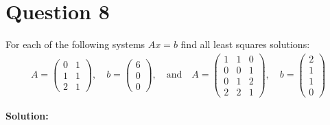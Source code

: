 \documentclass{article}
\begin{document}
\section*{Question 8}
For each of the following systems \(Ax = b\) find all least squares solutions:
\begin{align*}
    A = \begin{pmatrix} 0 & 1 \\ 1 & 1 \\ 2 & 1 \end{pmatrix}, \quad 
    b = \begin{pmatrix} 6 \\ 0 \\ 0 \end{pmatrix}, \quad \text{and} \quad
    A = \begin{pmatrix} 1 & 1 & 0 \\ 0 & 0 & 1 \\ 0 & 1 & 2 \\ 2 & 2 & 1 \end{pmatrix}, \quad 
    b = \begin{pmatrix} 2 \\ 1 \\ 1 \\ 0 \end{pmatrix}
\end{align*}

\vspace{0.25cm}\noindent\textbf{Solution:}
\end{document}
